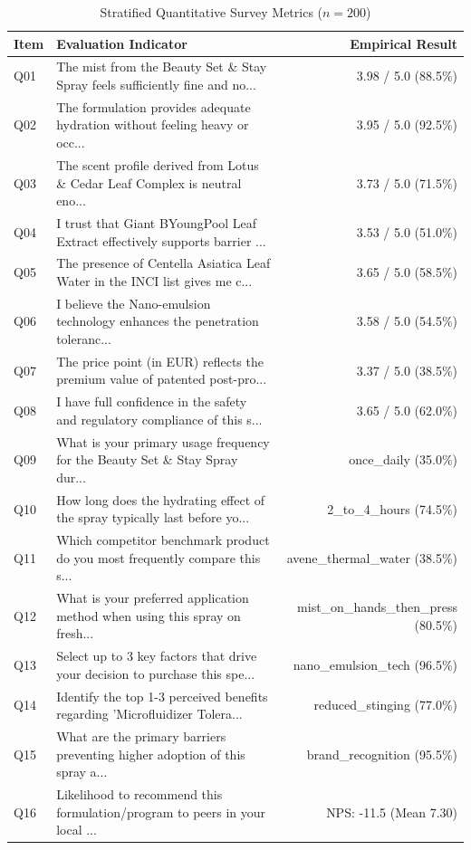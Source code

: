 \documentclass[10pt,twocolumn,a4paper]{article}
\begin{document}
\begin{table}[t]
\centering
\caption{Stratified Quantitative Survey Metrics ($n = 200$)}
\label{tab:metrics}
\small
\begin{tabularx}{\textwidth}{l X r}
\toprule
\textbf{Item} & \textbf{Evaluation Indicator} & \textbf{Empirical Result} \\
\midrule
Q01 & The mist from the Beauty Set \& Stay Spray feels sufficiently fine and no... & 3.98 / 5.0 (88.5\%) \\
Q02 & The formulation provides adequate hydration without feeling heavy or occ... & 3.95 / 5.0 (92.5\%) \\
Q03 & The scent profile derived from Lotus \& Cedar Leaf Complex is neutral eno... & 3.73 / 5.0 (71.5\%) \\
Q04 & I trust that Giant BYoungPool Leaf Extract effectively supports barrier ... & 3.53 / 5.0 (51.0\%) \\
Q05 & The presence of Centella Asiatica Leaf Water in the INCI list gives me c... & 3.65 / 5.0 (58.5\%) \\
Q06 & I believe the Nano-emulsion technology enhances the penetration toleranc... & 3.58 / 5.0 (54.5\%) \\
Q07 & The price point (in EUR) reflects the premium value of patented post-pro... & 3.37 / 5.0 (38.5\%) \\
Q08 & I have full confidence in the safety and regulatory compliance of this s... & 3.65 / 5.0 (62.0\%) \\
Q09 & What is your primary usage frequency for the Beauty Set \& Stay Spray dur... & once\_daily (35.0\%) \\
Q10 & How long does the hydrating effect of the spray typically last before yo... & 2\_to\_4\_hours (74.5\%) \\
Q11 & Which competitor benchmark product do you most frequently compare this s... & avene\_thermal\_water (38.5\%) \\
Q12 & What is your preferred application method when using this spray on fresh... & mist\_on\_hands\_then\_press (80.5\%) \\
Q13 & Select up to 3 key factors that drive your decision to purchase this spe... & nano\_emulsion\_tech (96.5\%) \\
Q14 & Identify the top 1-3 perceived benefits regarding 'Microfluidizer Tolera... & reduced\_stinging (77.0\%) \\
Q15 & What are the primary barriers preventing higher adoption of this spray a... & brand\_recognition (95.5\%) \\
Q16 & Likelihood to recommend this formulation/program to peers in your local ... & NPS: -11.5 (Mean 7.30) \\
\bottomrule
\end{tabularx}
\end{table}
\end{document}
